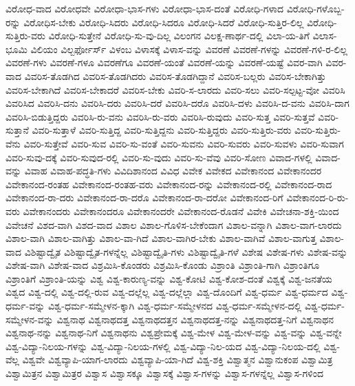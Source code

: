 {ವಿರೋಧ-ವಾದ
ವಿರೋಧವೇ
ವಿರೋಧಾ-ಭಾಸ-ಗಳು
ವಿರೋಧಾ-ಭಾಸ-ದಂತೆ
ವಿರೋಧಿ-ಗಳಾದ
ವಿರೋಧಿ-ಗಳೊಬ್ಬ-ರನ್ನು
ವಿರೋಧಿಸ-ಬೇಕು
ವಿರೋಧಿ-ಸಿದರು
ವಿರೋಧಿ-ಸಿದರೂ
ವಿರೋಧಿ-ಸಿದರೆ
ವಿರೋಧಿ-ಸುತ್ತಿರ-ಲಿಲ್ಲ
ವಿರೋಧಿ-ಸುತ್ತಿರು-ವರು
ವಿರೋಧಿ-ಸುತ್ತೇನೆ
ವಿರೋಧಿ-ಸು-ವು-ದಿಲ್ಲ
ವಿಲಂಗನ
ವಿಲಕ್ಷ-ಣಾರ್ಥ-ದಲ್ಲಿ
ವಿಲಾ-ಯ-ತಿಗೆ
ವಿಲಾಸ-ಭೂಮಿ
ವಿಲಿಯಂ
ವಿಲ್ಬರ್ಫೋರ್ಸ್
ವಿಳಂಬ
ವಿಳಾಸಕ್ಕೆ
ವಿಳಾಸ-ವನ್ನು
ವಿವರಣೆ
ವಿವರಣೆ-ಗಳನ್ನು
ವಿವರಣೆ-ಗಳಿ-ರ-ಲಿಲ್ಲ
ವಿವರಣೆ-ಗಳು
ವಿವರಣೆ-ಗಳೂ
ವಿವರಣೆಗೂ
ವಿವರಣೆ-ಯಂತೆ
ವಿವರಣೆ-ಯನ್ನು
ವಿವರಣೆ-ಯಷ್ಟೆ
ವಿವರ-ವಾಗಿ
ವಿವರ-ವಾದ
ವಿವರಿಸ-ತೊಡಗಿದ
ವಿವರಿಸ-ತೊಡಗಿದರು
ವಿವರಿಸ-ತೊಡಗಿದ್ದಾನೆ
ವಿವರಿಸ-ಬಲ್ಲರು
ವಿವರಿಸ-ಬೇಕಾಗಿತ್ತು
ವಿವರಿಸ-ಬೇಕಾಗಿದೆ
ವಿವರಿಸ-ಬೇಕಾದರೆ
ವಿವರಿಸ-ಬೇಕು
ವಿವರಿ-ಸ-ಲಾರದು
ವಿವರಿ-ಸಲು
ವಿವರಿ-ಸಲ್ಪಟ್ಟ-ವೋ
ವಿವರಿಸಿ
ವಿವರಿಸಿದ
ವಿವರಿಸಿ-ದನು
ವಿವರಿಸಿ-ದರು
ವಿವರಿಸಿ-ದರೆ
ವಿವರಿಸಿ-ದರೊ
ವಿವರಿಸಿ-ದಳು
ವಿವರಿಸಿ-ದ-ವನು
ವಿವರಿಸಿ-ದಾಗ
ವಿವರಿಸಿ-ಬಿಡುತ್ತಿದ್ದರು
ವಿವರಿಸಿ-ರು-ವನು
ವಿವರಿಸಿ-ರು-ವರು
ವಿವರಿಸಿ-ರುವುದು
ವಿವರಿ-ಸುತ್ತ
ವಿವರಿ-ಸುತ್ತವೆ
ವಿವರಿ-ಸುತ್ತಾನೆ
ವಿವರಿ-ಸುತ್ತಾಳೆ
ವಿವರಿ-ಸುತ್ತಿದ್ದ
ವಿವರಿ-ಸುತ್ತಿದ್ದನು
ವಿವರಿ-ಸುತ್ತಿದ್ದರು
ವಿವರಿ-ಸುತ್ತಿರು-ವರು
ವಿವರಿ-ಸುತ್ತಿರು-ವೆನು
ವಿವರಿ-ಸುತ್ತೇವೆ
ವಿವರಿ-ಸುವ
ವಿವರಿ-ಸು-ವಂತೆ
ವಿವರಿ-ಸುವನು
ವಿವರಿ-ಸುವರು
ವಿವರಿ-ಸುವಳು
ವಿವರಿ-ಸುವಾಗ
ವಿವರಿ-ಸುವು-ದಕ್ಕೆ
ವಿವರಿ-ಸುವುದ-ರಲ್ಲಿ
ವಿವರಿ-ಸು-ವುದು
ವಿವರಿ-ಸು-ವೆವು
ವಿವರಿ-ಸೋಣ
ವಿವಾದ-ಗಳಲ್ಲಿ
ವಿವಾದ-ವನ್ನು
ವಿವಾಹ
ವಿವಾಹ-ಪದ್ಧತಿ-ಗಳು
ವಿವಿದಿಶಾನಂದ
ವಿವಿಧ
ವಿವೇಕ
ವಿವೇಕದ
ವಿವೇಕಾನಂದ
ವಿವೇಕಾನಂದರ
ವಿವೇಕಾನಂದ-ರಂತಹ
ವಿವೇಕಾನಂದ-ರಂತಹ-ವರು
ವಿವೇಕಾನಂದ-ರನ್ನು
ವಿವೇಕಾನಂದ-ರಲ್ಲಿ
ವಿವೇಕಾನಂದ-ರಾದ
ವಿವೇಕಾನಂದ-ರಾ-ದರು
ವಿವೇಕಾನಂದ-ರಾ-ದರೊ
ವಿವೇಕಾನಂದ-ರಾ-ದರೋ
ವಿವೇಕಾನಂದ-ರಿಗೆ
ವಿವೇಕಾನಂದ-ರಿ-ರು-ವರು
ವಿವೇಕಾನಂದರು
ವಿವೇಕಾನಂದರೂ
ವಿವೇಕಾನಂದರೇ
ವಿವೇಕಾನಂದ-ರೊಡನೆ
ವಿವೇಕಿ
ವಿವೇಚನಾ-ಶಕ್ತಿ-ಯಿಂದ
ವಿವೇಚನೆ
ವಿಶದ-ವಾಗಿ
ವಿಶದ-ವಾದ
ವಿಶಾಲ
ವಿಶಾಲ-ಗೊಳಿಸ-ಬೇಕೆಂದಾಗ
ವಿಶಾಲ-ವನ್ನಾಗಿ
ವಿಶಾಲ-ವಾಗ-ಲಾರದು
ವಿಶಾಲ-ವಾಗಿ
ವಿಶಾಲ-ವಾಗಿತ್ತು
ವಿಶಾಲ-ವಾ-ಗಿದೆ
ವಿಶಾಲ-ವಾಗಿರ-ಬೇಕು
ವಿಶಾಲ-ವಾಗಿವೆ
ವಿಶಾಲ-ವಾಗುತ್ತ
ವಿಶಾಲ-ವಾದ
ವಿಶಿಷ್ಟಾದ್ವೈತ
ವಿಶಿಷ್ಟಾದ್ವೈತ-ಗಳನ್ನೆಲ್ಲ
ವಿಶಿಷ್ಟಾದ್ವೈತಿ-ಗಳು
ವಿಶಿಷ್ಟಾದ್ವೈತಿ-ಗಳೆ
ವಿಶೇಷ
ವಿಶೇಷ-ಗಳು
ವಿಶೇಷ-ವನ್ನು
ವಿಶೇಷ-ವಾಗಿ
ವಿಶೇಷ-ವಾದ
ವಿಶ್ರಮಿಸಿ-ಕೊಂಡರು
ವಿಶ್ರಮಿಸಿ-ಕೊಂಡು
ವಿಶ್ರಾಂತಿ
ವಿಶ್ರಾಂತಿ-ಗಾಗಿ
ವಿಶ್ರಾಂತಿಗೂ
ವಿಶ್ರಾಂತಿಗೆ
ವಿಶ್ರಾಂತಿ-ಯನ್ನು
ವಿಶ್ವ
ವಿಶ್ವ-ಕಾರುಣ್ಯ-ವನ್ನು
ವಿಶ್ವ-ಕೋಟಿ
ವಿಶ್ವ-ಕೋಶ-ದಂತೆ
ವಿಶ್ವಕ್ಕೆ
ವಿಶ್ವ-ಜನತೆಯ
ವಿಶ್ವದ
ವಿಶ್ವ-ದಲ್ಲಿ
ವಿಶ್ವ-ದಲ್ಲಿ-ರುವ
ವಿಶ್ವ-ದಲ್ಲೆಲ್ಲ
ವಿಶ್ವ-ದಲ್ಲೆಲ್ಲಾ
ವಿಶ್ವ-ದೊಂದಿಗೆ
ವಿಶ್ವ-ಧರ್ಮ
ವಿಶ್ವ-ಧರ್ಮದ
ವಿಶ್ವ-ಧರ್ಮ-ವನ್ನು
ವಿಶ್ವ-ಧರ್ಮ-ಸಮ್ಮೇಳನ-ಕ್ಕಾಗಿ
ವಿಶ್ವ-ಧರ್ಮ-ಸಮ್ಮೇಳನದ
ವಿಶ್ವ-ಧರ್ಮ-ಸಮ್ಮೇಳನ-ದಲ್ಲಿ
ವಿಶ್ವ-ಧರ್ಮ-ಸಮ್ಮೇಳನ-ವನ್ನು
ವಿಶ್ವನಾಥ
ವಿಶ್ವನಾಥದತ್ತ
ವಿಶ್ವನಾಥದತ್ತನ
ವಿಶ್ವನಾಥದತ್ತ-ನನ್ನು
ವಿಶ್ವನಾಥದತ್ತ-ನಿಗೆ
ವಿಶ್ವನಾಥನ
ವಿಶ್ವನಾಥ-ನನ್ನು
ವಿಶ್ವನಾಥ-ನಿಗೆ
ವಿಶ್ವನಾಥನು
ವಿಶ್ವಪ್ರೇಮಕ್ಕೆ
ವಿಶ್ವ-ಮೇಳ
ವಿಶ್ವ-ಮೇಳ-ವನ್ನು
ವಿಶ್ವ-ವನ್ನು
ವಿಶ್ವ-ವನ್ನೇ
ವಿಶ್ವ-ವಿದ್ಯಾ-ನಿಲಯ-ಗಳನ್ನು
ವಿಶ್ವ-ವಿದ್ಯಾ-ನಿಲಯ-ಗಳಲ್ಲಿ
ವಿಶ್ವ-ವಿದ್ಯಾ-ನಿಲ-ಯದ
ವಿಶ್ವ-ವಿದ್ಯಾ-ನಿಲಯ-ದಲ್ಲಿ
ವಿಶ್ವ-ವೆಲ್ಲ
ವಿಶ್ವವೇ
ವಿಶ್ವವ್ಯಾಪಿ-ಯಾಗ-ಲಾರದು
ವಿಶ್ವವ್ಯಾಪಿ-ಯಾ-ಗಿದೆ
ವಿಶ್ವ-ಶಕ್ತಿ
ವಿಶ್ವಾತ್ಮನ
ವಿಶ್ವಾನುಕಂಪ
ವಿಶ್ವಾಮಿತ್ರ
ವಿಶ್ವಾಮಿತ್ರನ
ವಿಶ್ವಾಮಿತ್ರರ
ವಿಶ್ವಾಸ
ವಿಶ್ವಾಸಕ್ಕೂ
ವಿಶ್ವಾಸಕ್ಕೆ
ವಿಶ್ವಾಸ-ಗಳನ್ನು
ವಿಶ್ವಾಸ-ಗಳನ್ನೆಲ್ಲ
ವಿಶ್ವಾಸ-ಗಳಿಂದ
}
